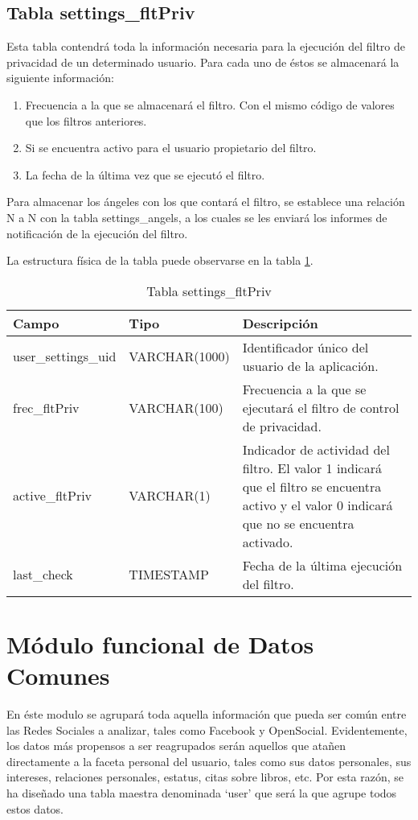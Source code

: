 \subsection{Tabla settings\_fltPriv}
Esta tabla contendrá toda la información necesaria para la ejecución del filtro de privacidad de un determinado usuario. Para cada uno de éstos se almacenará la siguiente información:
\begin{enumerate}
\item Frecuencia a la que se almacenará el filtro. Con el mismo código de valores que los filtros anteriores.
\item Si se encuentra activo para el usuario propietario del filtro.
\item La fecha de la última vez que se ejecutó el filtro.
\end{enumerate}
Para almacenar los ángeles con los que contará el filtro, se establece una relación N a N con la tabla settings\_angels, a los cuales se les enviará los informes de notificación de la ejecución del filtro.
\bigskip
\par
La estructura física de la tabla puede observarse en la tabla \ref{tabSettingsFltPriv}.
\begin{table}
\begin{center}
\begin{tabular}[c]{| l | l | p{60mm} |}\hline
\textbf{Campo}&\textbf{Tipo}&\textbf{Descripción} \\ \hline
user\_settings\_uid & VARCHAR(1000) & Identificador único del usuario de la aplicación. \\ \hline
frec\_fltPriv & VARCHAR(100) & Frecuencia a la que se ejecutará el filtro de control de privacidad. \\ \hline
active\_fltPriv & VARCHAR(1) & Indicador de actividad del filtro. El valor 1 indicará que el filtro se encuentra activo y el valor 0 indicará que no se encuentra activado. \\ \hline
last\_check & TIMESTAMP & Fecha de la última ejecución del filtro. \\ \hline
\end{tabular}
\end{center}
\caption{Tabla settings\_fltPriv} \label{tabSettingsFltPriv}
\end{table}

\section{Módulo funcional de Datos Comunes}
En éste modulo se agrupará toda aquella información que pueda ser común entre las Redes Sociales a analizar, tales como Facebook y OpenSocial. Evidentemente, los datos más propensos a ser reagrupados serán aquellos que atañen directamente a la faceta personal del usuario, tales como sus datos personales, sus intereses, relaciones personales, estatus, citas sobre libros, etc. Por esta razón, se ha diseñado una tabla maestra denominada `user' que será la que agrupe todos estos datos.

